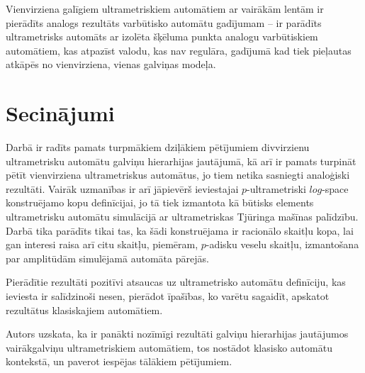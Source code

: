 \documentclass{ludis}
\begin{document}
Vienvirziena galīgiem ultrametriskiem automātiem ar vairākām lentām ir pierādīts analogs rezultāts varbūtisko automātu gadījumam -- ir parādīts ultrametrisks automāts ar izolēta šķēluma punkta analogu varbūtiskiem automātiem, kas atpazīst valodu, kas nav regulāra, gadījumā kad tiek pieļautas atkāpēs no vienvirziena, vienas galviņas modeļa.

\chapter{Secinājumi}
Darbā ir radīts pamats turpmākiem dziļākiem pētījumiem divvirzienu ultrametrisku automātu galviņu hierarhijas jautājumā, kā arī ir pamats turpināt pētīt vienvirziena ultrametriskus automātus, jo tiem netika sasniegti analoģiski rezultāti. Vairāk uzmanības ir arī jāpievērš ieviestajai $p$-ultrametriski $log$-space konstruējamo kopu definīcijai, jo tā tiek izmantota kā būtisks elements ultrametrisku automātu simulācijā ar ultrametriskas Tjūringa mašīnas palīdzību. Darbā tika parādīts tikai tas, ka šādi konstruējama ir racionālo skaitļu kopa, lai gan interesi raisa arī citu skaitļu, piemēram, $p$-adisku veselu skaitļu, izmantošana par amplitūdām simulējamā automāta pārejās.

Pierādītie rezultāti pozitīvi atsaucas uz ultrametrisko automātu definīciju, kas ieviesta ir salīdzinoši nesen, pierādot īpašības, ko varētu sagaidīt, apskatot rezultātus klasiskajiem automātiem.

Autors uzskata, ka ir panākti nozīmīgi rezultāti galviņu hierarhijas jautājumos vairākgalviņu ultrametriskiem automātiem, tos nostādot klasisko automātu kontekstā, un paverot iespējas tālākiem pētījumiem.

\printbibliography
\end{document}
